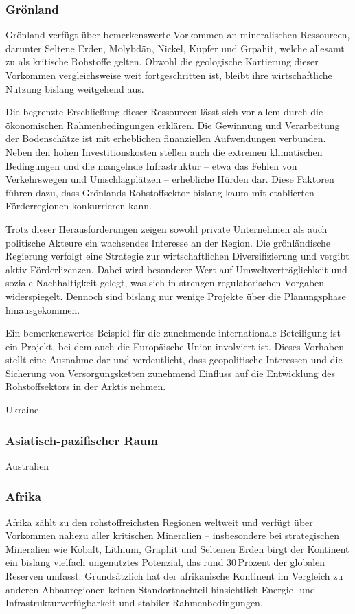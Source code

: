 \documentclass[12pt,a4paper,oneside]{book} %
\begin{document}
\subsubsection{Grönland}

Grönland verfügt über bemerkenswerte Vorkommen an mineralischen Ressourcen, darunter Seltene Erden, Molybdän, Nickel, Kupfer und Grpahit, welche allesamt zu als kritische Rohstoffe gelten. Obwohl die geologische Kartierung dieser Vorkommen vergleichsweise weit fortgeschritten ist, bleibt ihre wirtschaftliche Nutzung bislang weitgehend aus.

Die begrenzte Erschließung dieser Ressourcen lässt sich vor allem durch die ökonomischen Rahmenbedingungen erklären. Die Gewinnung und Verarbeitung der Bodenschätze ist mit erheblichen finanziellen Aufwendungen verbunden. Neben den hohen Investitionskosten stellen auch die extremen klimatischen Bedingungen und die mangelnde Infrastruktur – etwa das Fehlen von Verkehrswegen und Umschlagplätzen – erhebliche Hürden dar. Diese Faktoren führen dazu, dass Grönlands Rohstoffsektor bislang kaum mit etablierten Förderregionen konkurrieren kann.

Trotz dieser Herausforderungen zeigen sowohl private Unternehmen als auch politische Akteure ein wachsendes Interesse an der Region. Die grönländische Regierung verfolgt eine Strategie zur wirtschaftlichen Diversifizierung und vergibt aktiv Förderlizenzen. Dabei wird besonderer Wert auf Umweltverträglichkeit und soziale Nachhaltigkeit gelegt, was sich in strengen regulatorischen Vorgaben widerspiegelt. Dennoch sind bislang nur wenige Projekte über die Planungsphase hinausgekommen.

Ein bemerkenswertes Beispiel für die zunehmende internationale Beteiligung ist ein Projekt, bei dem auch die Europäische Union involviert ist. Dieses Vorhaben stellt eine Ausnahme dar und verdeutlicht, dass geopolitische Interessen und die Sicherung von Versorgungsketten zunehmend Einfluss auf die Entwicklung des Rohstoffsektors in der Arktis nehmen.

Ukraine

\subsubsection{Asiatisch-pazifischer Raum}
Australien

\subsubsection{Afrika}
Afrika zählt zu den rohstoffreichsten Regionen weltweit und verfügt über Vorkommen nahezu aller kritischen Mineralien -- insbesondere bei strategischen Mineralien wie Kobalt, Lithium, Graphit und Seltenen Erden birgt der Kontinent ein bislang vielfach ungenutztes Potenzial, das rund 30 Prozent der globalen Reserven umfasst. Grundsätzlich hat der afrikanische Kontinent im Vergleich zu anderen Abbauregionen keinen Standortnachteil hinsichtlich Energie- und Infrastrukturverfügbarkeit und stabiler Rahmenbedingungen. 
\end{document}
